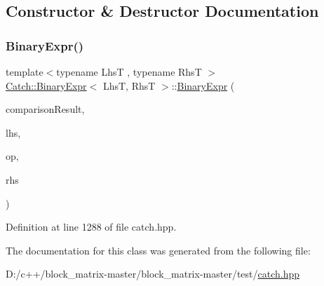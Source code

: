 \subsection{Constructor \& Destructor Documentation}
\mbox{\label{class_catch_1_1_binary_expr_a657d66346aef97a760c22776fe6008b6}} 
\subsubsection{\texorpdfstring{Binary\+Expr()}{BinaryExpr()}}
{\footnotesize\ttfamily template$<$typename LhsT , typename RhsT $>$ \\
\mbox{\hyperlink{class_catch_1_1_binary_expr}{Catch\+::\+Binary\+Expr}}$<$ LhsT, RhsT $>$\+::\mbox{\hyperlink{class_catch_1_1_binary_expr}{Binary\+Expr}} (\begin{DoxyParamCaption}\item[{bool}]{comparison\+Result,  }\item[{LhsT}]{lhs,  }\item[{\mbox{\hyperlink{class_catch_1_1_string_ref}{String\+Ref}}}]{op,  }\item[{RhsT}]{rhs }\end{DoxyParamCaption})\hspace{0.3cm}{\ttfamily [inline]}}



Definition at line 1288 of file catch.\+hpp.



The documentation for this class was generated from the following file\+:\begin{DoxyCompactItemize}
\item 
D\+:/c++/block\+\_\+matrix-\/master/block\+\_\+matrix-\/master/test/\mbox{\hyperlink{catch_8hpp}{catch.\+hpp}}\end{DoxyCompactItemize}
